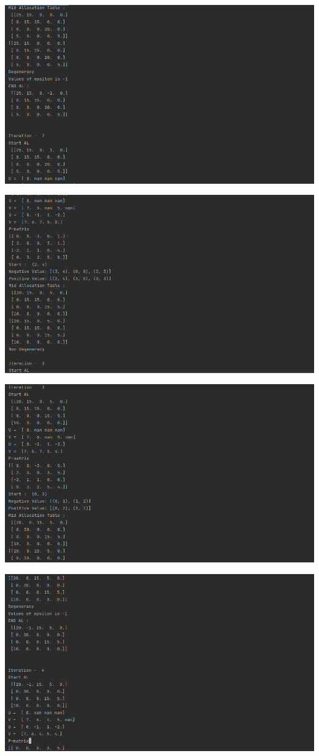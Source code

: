 \documentclass[12pt, letterpaper, twoside]{book}
\begin{document}
\includegraphics[width=550pt]{Output3}

\includegraphics[width=550pt]{Output4}

\includegraphics[width=550pt]{Output5}

\includegraphics[width=550pt]{Output6}
\end{document}
